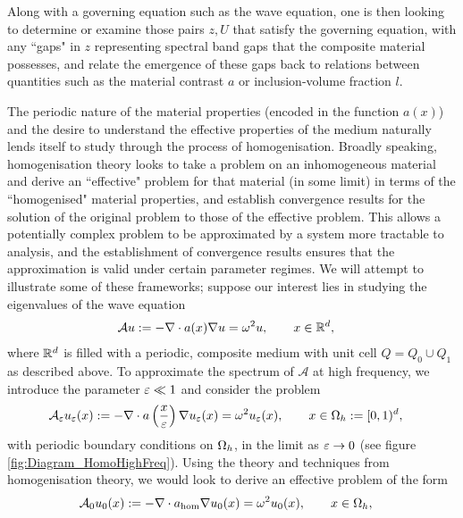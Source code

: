 Along with a governing equation such as the wave equation, one is then looking to determine or examine those pairs $z, U$ that satisfy the governing equation, with any ``gaps" in $z$ representing spectral band gaps that the composite material possesses, and relate the emergence of these gaps back to relations between quantities such as the material contrast $a$ or inclusion-volume fraction $l$. 

The periodic nature of the material properties (encoded in the function $a(x)$) and the desire to understand the effective properties of the medium naturally lends itself to study through the process of homogenisation.
Broadly speaking, homogenisation theory looks to take a problem on an inhomogeneous material and derive an ``effective" problem for that material (in some limit) in terms of the ``homogenised" material properties, and establish convergence results for the solution of the original problem to those of the effective problem.
This allows a potentially complex problem to be approximated by a system more tractable to analysis, and the establishment of convergence results ensures that the approximation is valid under certain parameter regimes.
We will attempt to illustrate some of these frameworks; suppose our interest lies in studying the eigenvalues of the wave equation
\begin{align*}
	\mathcal{A}u &:= -\nabla\cdot a(x)\nabla u = \omega^2 u, \qquad x\in\mathbb{R}^d,
\end{align*}
where $\mathbb{R}^d$ is filled with a periodic, composite medium with unit cell $Q=Q_0\cup Q_1$ as described above.
To approximate the spectrum of $\mathcal{A}$ at high frequency, we introduce the parameter $\varepsilon\ll 1$ and consider the problem
\begin{align*}
	\mathcal{A}_{\varepsilon}u_{\varepsilon}(x) &:= -\nabla\cdot a\left( \frac{x}{\varepsilon} \right)\nabla u_{\varepsilon}(x) = \omega^2 u_{\varepsilon}(x), \qquad x\in\Omega_{h}:=[0,1)^d,
\end{align*}
with periodic boundary conditions on $\Omega_h$, in the limit as $\varepsilon\rightarrow0$ (see figure \ref{fig:Diagram_HomoHighFreq}).
Using the theory and techniques from homogenisation theory, we would look to derive an effective problem of the form
\begin{align*}
	\mathcal{A}_0 u_0(x) &:= -\nabla\cdot a_{\mathrm{hom}}\nabla u_0(x) = \omega^2 u_0(x), \qquad x\in\Omega_h,
\end{align*} 
